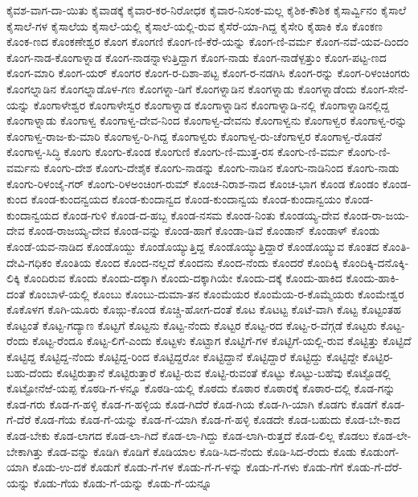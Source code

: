 ಕೈವಶ-ವಾಗ-ದಾ-ಯಿತು
ಕೈವಾಡಕ್ಕೆ
ಕೈವಾರ-ಕರ-ನಿರೋಧಕ
ಕೈವಾರ-ನಿಸಂಕ-ಮಲ್ಲ
ಕೈಶಿಕ-ಕೌಶಿಕ
ಕೈಸಾರ್ವ್ವಿನಂ
ಕೈಸಾಲೆ
ಕೈಸಾಲೆ-ಗಳ
ಕೈಸಾಲೆಯ
ಕೈಸಾಲೆ-ಯಲ್ಲಿ
ಕೈಸಾಲೆ-ಯಲ್ಲಿ-ರುವ
ಕೈಸೆರೆ-ಯಾ-ಗಿದ್ದ
ಕೈಸೇರಿ
ಕೈಹಾಕಿ
ಕೊ
ಕೊಂಕಣ
ಕೊಂಕ-ಣದ
ಕೊಂಕಣೇಶ್ವರ
ಕೊಂಗ
ಕೊಂಗಣಿ
ಕೊಂಗ-ಣಿ-ಕೆರೆ-ಯನ್ನು
ಕೊಂಗ-ಣಿ-ವರ್ಮ
ಕೊಂಗ-ನವೆ-ಯವ-ದಿಂದಂ
ಕೊಂಗ-ನಾಡ-ಕೊಂಗಾಳ್ನಾಡ
ಕೊಂಗ-ನಾಡನ್ನಾಳುತ್ತಿದ್ದಾಗ
ಕೊಂಗ-ನಾಡು
ಕೊಂಗ-ನಾಡೆಳ್ಪತ್ತುಂ
ಕೊಂಗ-ಪಟ್ಟ-ಣದ
ಕೊಂಗ-ಮಾರಿ
ಕೊಂಗ-ಯರ್
ಕೊಂಗರ
ಕೊಂಗ-ರ-ದಿಶಾ-ಪಟ್ಟ
ಕೊಂಗ-ರ-ನಡಗಿಸಿ
ಕೊಂಗ-ರನ್ನು
ಕೊಂಗ-ರಿಳಂಚಿಂಗರು
ಕೊಂಗಲ್ನಾಡಿನ
ಕೊಂಗಲ್ನಾಡೊಳ-ಗಣ
ಕೊಂಗಳ್ನಾ-ಡಿಗೆ
ಕೊಂಗಳ್ನಾಡಿನ
ಕೊಂಗಳ್ನಾಡು
ಕೊಂಗಳ್ನಾಡೆಂದು
ಕೊಂಗ-ಸೇನೆ-ಯನ್ನು
ಕೊಂಗಾಳೇಶ್ವರ
ಕೊಂಗಾಳೇಸ್ವರ
ಕೊಂಗಾಳ್ನಾಡ
ಕೊಂಗಾಳ್ನಾಡಿನ
ಕೊಂಗಾಳ್ನಾಡಿ-ನಲ್ಲಿ
ಕೊಂಗಾಳ್ನಾಡಿನಲ್ಲಿದ್ದ
ಕೊಂಗಾಳ್ನಾಡು
ಕೊಂಗಾಳ್ವ
ಕೊಂಗಾಳ್ವ-ದೇವ-ನಿಂದ
ಕೊಂಗಾಳ್ವ-ದೇವನು
ಕೊಂಗಾಳ್ವನು
ಕೊಂಗಾಳ್ವರ
ಕೊಂಗಾಳ್ವ-ರನ್ನು
ಕೊಂಗಾಳ್ವ-ರಾಜ-ಕು-ಮಾರಿ
ಕೊಂಗಾಳ್ವ-ರಿ-ಗಿದ್ದ
ಕೊಂಗಾಳ್ವರು
ಕೊಂಗಾಳ್ವ-ರು-ಚೆಂಗಾಳ್ವರ
ಕೊಂಗಾಳ್ವ-ರೊಡನೆ
ಕೊಂಗಾಳ್ವ-ಸಿದ್ಧಿ
ಕೊಂಗು
ಕೊಂಗು-ಕೊಂಡ
ಕೊಂಗುಣಿ
ಕೊಂಗು-ಣಿ-ಮುತ್ತ-ರಸ
ಕೊಂಗು-ಣಿ-ವರ್ಮ
ಕೊಂಗು-ಣಿ-ವರ್ಮನು
ಕೊಂಗು-ದೇಶ
ಕೊಂಗು-ದೇಶೈಕ
ಕೊಂಗು-ನಾಡನ್ನು
ಕೊಂಗು-ನಾಡಿನ
ಕೊಂಗು-ನಾಡಿನಿಂದ
ಕೊಂಗು-ನಾಡು
ಕೊಂಗು-ರಿಳಂಜೈ-ಗರ್
ಕೊಂಗು-ರಿಳಅಂಚಿಂಗ-ರುಮ್
ಕೊಂಚ-ನಿರಾಶ-ನಾದ
ಕೊಂಚ-ಭಾಗ
ಕೊಂಡ
ಕೊಂಡಂ
ಕೊಂಡ-ಕುಂದ
ಕೊಂಡ-ಕುಂದನ್ವಯದ
ಕೊಂಡ-ಕುಂದಾನ್ವದ
ಕೊಂಡ-ಕುಂದಾನ್ವಯ
ಕೊಂಡ-ಕುಂದಾನ್ವಯಂ
ಕೊಂಡ-ಕುಂದಾನ್ವಯದ
ಕೊಂಡ-ಗುಳಿ
ಕೊಂಡ-ದ-ಹಬ್ಬ
ಕೊಂಡ-ನಸಮ
ಕೊಂಡ-ನಿಂತು
ಕೊಂಡಯ್ಯ-ದೇವ
ಕೊಂಡ-ರಾ-ಜಯ-ದೇವ
ಕೊಂಡ-ರಾಜಯ್ಯ-ದೇವ
ಕೊಂಡ-ವನ್ನು
ಕೊಂಡ-ಹಾಗೆ
ಕೊಂಡಾ-ಡಿವೆ
ಕೊಂಡಾನ್
ಕೊಂಡಾಳ್
ಕೊಂಡು
ಕೊಂಡೆ-ಯವ-ನಾಡಿದ
ಕೊಂಡೊಯ್ದು
ಕೊಂಡೊಯ್ಯುತ್ತಿದ್ದ
ಕೊಂಡೊಯ್ಯುತ್ತಿದ್ದಾರೆ
ಕೊಂಡೊಯ್ಯುವ
ಕೊಂತದ
ಕೊಂತಿ-ದೇವಿ-ಗಧಿಕಂ
ಕೊಂತಿಯ
ಕೊಂದ
ಕೊಂದ-ನಲ್ಲದೆ
ಕೊಂದನು
ಕೊಂದ-ನೆಂದು
ಕೊಂದರೆ
ಕೊಂದಿಕ್ಕಿ
ಕೊಂದಿಕ್ಕಿ-ದನೊಕ್ಕಿ-ಲಿಕ್ಕಿ
ಕೊಂದಿರುವ
ಕೊಂದು
ಕೊಂದು-ದಕ್ಕಾಗಿ
ಕೊಂದು-ದಕ್ಕಾಗಿಯೇ
ಕೊಂದು-ದಕ್ಕೆ
ಕೊಂದು-ಹಾಕಿದ
ಕೊಂದು-ಹಾಕಿ-ದಂತೆ
ಕೊಂಬಾಳೆ-ಯಲ್ಲಿ
ಕೊಂಬು
ಕೊಂಬು-ದುಮಾ-ತನ
ಕೊಂಮೆಯರ
ಕೊಂಮೆಯ-ರ-ಕೊಮ್ಮೆಯರು
ಕೊಂಮೇಶ್ವರ
ಕೊಕೊಳಗ
ಕೊಗಿ-ಯೂರು
ಕೊಙ್ಗು-ಕೊಂಡ
ಕೊಚ್ಚಿ-ಹೋಗ-ದಂತೆ
ಕೊಟ
ಕೊಟಟ್ಟ
ಕೊಟೆ-ವಾಗಿ
ಕೊಟ್ಟ
ಕೊಟ್ಟಂತಹ
ಕೊಟ್ಟಂತೆ
ಕೊಟ್ಟ-ಗದ್ಯಾಣ
ಕೊಟ್ಟಗೆ
ಕೊಟ್ಟನು
ಕೊಟ್ಟ-ನೆಂದು
ಕೊಟ್ಟರ
ಕೊಟ್ಟ-ರದ
ಕೊಟ್ಟ-ರ-ವೆಗ್ಗಡೆ
ಕೊಟ್ಟರು
ಕೊಟ್ಟ-ರೆಂದು
ಕೊಟ್ಟ-ರೆಂದೂ
ಕೊಟ್ಟ-ಲಿಗೆ-ಎಂದು
ಕೊಟ್ಟಳು
ಕೊಟ್ಟಾಗ
ಕೊಟ್ಟಿಗೆ-ಗಳ
ಕೊಟ್ಟಿಗೆ-ಯಲ್ಲಿ-ರುವ
ಕೊಟ್ಟಿತ್ತು
ಕೊಟ್ಟಿದೆ
ಕೊಟ್ಟಿದ್ದ
ಕೊಟ್ಟಿದ್ದ-ನೆಂದು
ಕೊಟ್ಟಿದ್ದ-ರಿಂದ
ಕೊಟ್ಟಿದ್ದರೋ
ಕೊಟ್ಟಿದ್ದಾನೆ
ಕೊಟ್ಟಿದ್ದಾರೆ
ಕೊಟ್ಟಿದ್ದು
ಕೊಟ್ಟಿದ್ದೇ
ಕೊಟ್ಟಿರ-ಬಹು-ದೆಂದು
ಕೊಟ್ಟಿರುತ್ತಾನೆ
ಕೊಟ್ಟಿರುತ್ತಾರೆ
ಕೊಟ್ಟಿ-ರುವ
ಕೊಟ್ಟಿ-ರುವಂತೆ
ಕೊಟ್ಟು
ಕೊಟ್ಟು-ಬಹೆವು
ಕೊಟ್ಟೊಡಲ್ಲಿ
ಕೊಟ್ಟೋನೆಱೆ-ಯಪ್ಪ
ಕೊಠಡಿ-ಗ-ಳನ್ನೂ
ಕೊಠಡಿ-ಯಲ್ಲಿ
ಕೊಠದು
ಕೊಠಾರ
ಕೊಠಾರಕ್ಕೆ
ಕೊಠಾರ-ದಲ್ಲಿ
ಕೊಡ-ಗನ್ನು
ಕೊಡ-ಗರು
ಕೊಡ-ಗ-ಹಳ್ಳಿ
ಕೊಡ-ಗ-ಹಳ್ಳಿಯ
ಕೊಡ-ಗಿದೆರೆ
ಕೊಡ-ಗಿಯ
ಕೊಡ-ಗಿ-ಯಾಗಿ
ಕೊಡಗು
ಕೊಡಗೆ
ಕೊಡ-ಗೆ-ದೆರೆ
ಕೊಡ-ಗೆಯ
ಕೊಡ-ಗೆ-ಯನ್ನು
ಕೊಡ-ಗೆ-ಯಾಗಿ
ಕೊಡ-ಗೆ-ಹಳ್ಳಿ
ಕೊಡದೇ
ಕೊಡ-ಬಹುದು
ಕೊಡ-ಬೇ-ಕಾದ
ಕೊಡ-ಬೇಕು
ಕೊಡ-ಲಾಗದ
ಕೊಡ-ಲಾ-ಗಿದೆ
ಕೊಡ-ಲಾ-ಗಿದ್ದು
ಕೊಡ-ಲಾಗಿ-ರುತ್ತದೆ
ಕೊಡ-ಲಿಲ್ಲ
ಕೊಡಲು
ಕೊಡ-ಲೇ-ಬೇಕಾಗಿತ್ತು
ಕೊಡ-ವನ್ನು
ಕೊಡಿಗಿ
ಕೊಡಿಗೆ
ಕೊಡಿಯಾಲ
ಕೊಡಿ-ಸಿದ-ನೆಂದು
ಕೊಡಿ-ಸಿದ-ರೆಂದು
ಕೊಡು
ಕೊಡುಂಗೆ-ಯಾಗಿ
ಕೊಡು-ಉ-ದಕೆ
ಕೊಡುಗೆ
ಕೊಡು-ಗೆ-ಗಳ
ಕೊಡು-ಗೆ-ಗ-ಳನ್ನು
ಕೊಡು-ಗೆ-ಗಳು
ಕೊಡು-ಗೆಗೆ
ಕೊಡು-ಗೆ-ದೆರೆ-ಯನ್ನು
ಕೊಡು-ಗೆಯ
ಕೊಡು-ಗೆ-ಯನ್ನು
ಕೊಡು-ಗೆ-ಯನ್ನೂ
